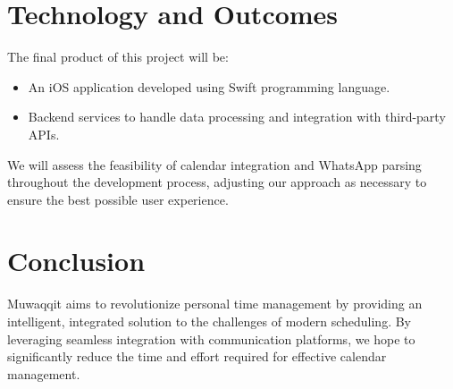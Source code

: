 \documentclass[12pt,a4paper]{article}
\begin{document}
\section{Technology and Outcomes}

The final product of this project will be:

\begin{itemize}
    \item An iOS application developed using Swift programming language.
    \item Backend services to handle data processing and integration with third-party APIs.
\end{itemize}

We will assess the feasibility of calendar integration and WhatsApp parsing throughout the development process, adjusting our approach as necessary to ensure the best possible user experience.

\section{Conclusion}

Muwaqqit aims to revolutionize personal time management by providing an intelligent, integrated solution to the challenges of modern scheduling. By leveraging seamless integration with communication platforms, we hope to significantly reduce the time and effort required for effective calendar management.

\newpage

 

\end{document}
